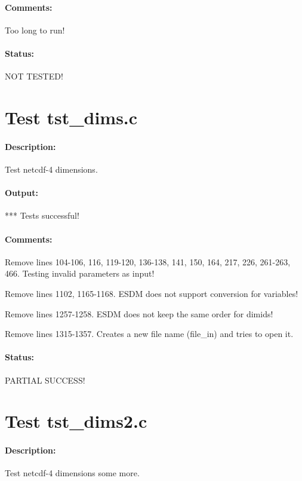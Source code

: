 \paragraph{Comments:} Too long to run!

\paragraph{Status:} NOT TESTED!

\section{Test tst\_dims.c}

\paragraph{Description:} Test netcdf-4 dimensions.

\paragraph{Output:} *** Tests successful!

\paragraph{Comments:} Remove lines 104-106, 116, 119-120, 136-138, 141, 150, 164, 217, 226, 261-263, 466. Testing invalid parameters as input!

Remove lines 1102, 1165-1168. ESDM does not support conversion for variables!

Remove lines 1257-1258. ESDM does not keep the same order for dimids!

Remove lines 1315-1357. Creates a new file name (file\_in) and tries to open it.

\paragraph{Status:} PARTIAL SUCCESS!

\section{Test tst\_dims2.c}

\paragraph{Description:} Test netcdf-4 dimensions some more.

